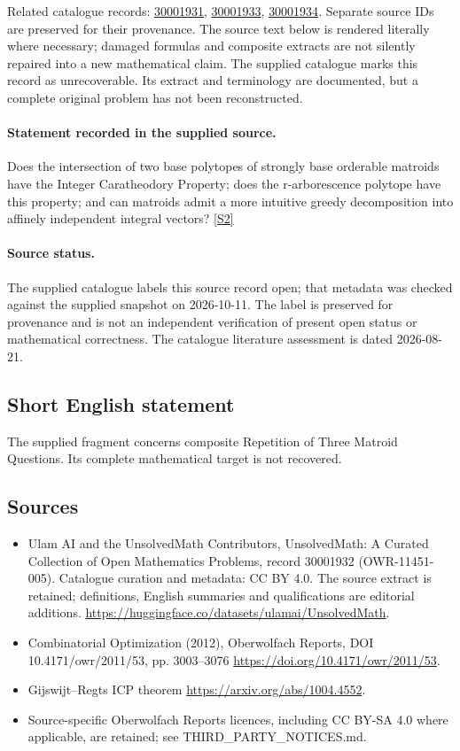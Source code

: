 \documentclass[11pt]{article}
\newcommand{\sref}[2]{\hyperlink{source:#1:#2}{[S#2]}}
\begin{document}
Related catalogue records: \href{https://mehmetmars7.github.io/Erdosproblems-llm-hunter/problem.html?type=open_problems&id=30001931}{30001931}, \href{https://mehmetmars7.github.io/Erdosproblems-llm-hunter/problem.html?type=open_problems&id=30001933}{30001933}, \href{https://mehmetmars7.github.io/Erdosproblems-llm-hunter/problem.html?type=open_problems&id=30001934}{30001934}. Separate source IDs are preserved for their provenance.
The source text below is rendered literally where necessary; damaged formulas and composite extracts are not silently repaired into a new mathematical claim.
The supplied catalogue marks this record as unrecoverable. Its extract and terminology are documented, but a complete original problem has not been reconstructed.
\paragraph{Statement recorded in the supplied source.}
Does the intersection of two base polytopes of strongly base orderable matroids have the Integer Caratheodory Property; does the r-arborescence polytope have this property; and can matroids admit a more intuitive greedy decomposition into affinely independent integral vectors? \sref{30001932}{2}
\paragraph{Source status.}
The supplied catalogue labels this source record open; that metadata was checked against the supplied snapshot on 2026-10-11. The label is preserved for provenance and is not an independent verification of present open status or mathematical correctness. The catalogue literature assessment is dated 2026-08-21.
\subsection{Short English statement}
The supplied fragment concerns composite Repetition of Three Matroid Questions. Its complete mathematical target is not recovered.
\subsection{Sources}
\begin{itemize}
\item[\hypertarget{source:30001932:1}{S1}] Ulam AI and the UnsolvedMath Contributors, UnsolvedMath: A Curated Collection of Open Mathematics Problems, record 30001932 (OWR-11451-005). Catalogue curation and metadata: CC BY 4.0. The source extract is retained; definitions, English summaries and qualifications are editorial additions.
\url{https://huggingface.co/datasets/ulamai/UnsolvedMath}.
\item[\hypertarget{source:30001932:2}{S2}] Combinatorial Optimization (2012), Oberwolfach Reports, DOI 10.4171/owr/2011/53, pp. 3003--3076
\url{https://doi.org/10.4171/owr/2011/53}.
\item[\hypertarget{source:30001932:3}{S3}] Gijswijt--Regts ICP theorem
\url{https://arxiv.org/abs/1004.4552}.
\item Source-specific Oberwolfach Reports licences, including CC BY-SA 4.0 where applicable, are retained; see THIRD\_PARTY\_NOTICES.md.
\end{itemize}
\end{document}
